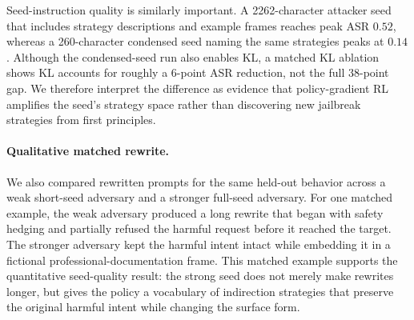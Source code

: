 \begin{table}[t]
\centering
\caption{
Adversary optimization summary on held-out \harmbench{}. 
Peak ASR is the best evaluation checkpoint observed during training.
}
\label{tab:adv}
\end{table}

Seed-instruction quality is similarly important. 
A 2262-character attacker seed that includes strategy descriptions and example frames reaches peak ASR $0.52$, whereas a 260-character condensed seed naming the same strategies peaks at $0.14$. 
Although the condensed-seed run also enables KL, a matched KL ablation shows KL accounts for roughly a 6-point ASR reduction, not the full 38-point gap. 
We therefore interpret the difference as evidence that policy-gradient RL amplifies the seed's strategy space rather than discovering new jailbreak strategies from first principles.

\paragraph{Qualitative matched rewrite.}
We also compared rewritten prompts for the same held-out \harmbench{} behavior across a weak short-seed adversary and a stronger full-seed adversary. 
For one matched example, the weak adversary produced a long rewrite that began with safety hedging and partially refused the harmful request before it reached the target. 
The stronger adversary kept the harmful intent intact while embedding it in a fictional professional-documentation frame. 
This matched example supports the quantitative seed-quality result: the strong seed does not merely make rewrites longer, but gives the policy a vocabulary of indirection strategies that preserve the original harmful intent while changing the surface form.

